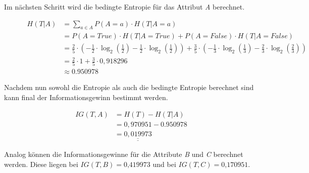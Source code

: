 Im nächsten Schritt wird die bedingte Entropie für das Attribut \textit{A} berechnet. \autocites{BedingteEntropie:online}{ConditionalEntropy:online}

\begin{figure}[htbp]
    \centering
    \begin{align*}
        H(T\vert A) &= \sum\limits_{a\in A}P(A=a) \cdot H(T\vert A=a) \\
                    &= P(A=True) \cdot H(T\vert A=True) + P(A=False) \cdot H(T\vert A=False) \\
                    &= \frac{2}{5} \cdot \left( -\frac{1}{2} \cdot \log_2\left( \frac{1}{2} \right) - \frac{1}{2} \cdot \log_{2}\left( \frac{1}{2} \right) \right) + \frac{3}{5} \cdot \left( -\frac{1}{3} \cdot \log_{2}\left( \frac{1}{3} \right) - \frac{2}{3} \cdot \log_{2}\left( \frac{2}{3} \right) \right) \\
                    &= \frac{2}{5} \cdot 1 + \frac{3}{5} \cdot 0,918296\\
                    &\approx 0.950978
    \end{align*}
\end{figure}

Nachdem nun sowohl die Entropie als auch die bedingte Entropie berechnet sind kann final der Informationsgewinn bestimmt werden.

\begin{figure}[h]
    \vspace{0.5cm}
    \centering
    \begin{align*}
        IG(T,A) &= H(T) - H(T\vert A) \\
                &= 0,970951 - 0.950978 \\
                &= \underline{\underline{0,019973}}
    \end{align*}
\end{figure}

Analog können die Informationsgewinne für die Attribute \textit{B} und \textit{C} berechnet werden. Diese liegen bei $ IG(T, B) = \textit{0,419973} $ und bei $ IG(T, C) = \textit{0,170951} $.

